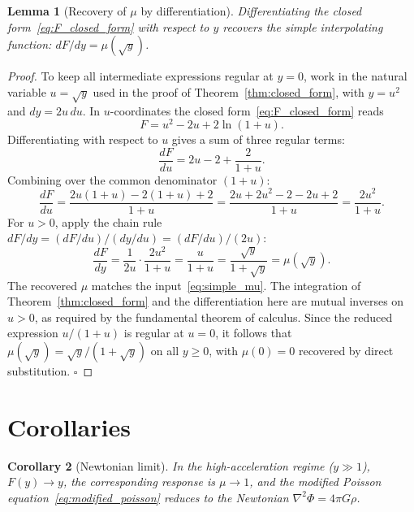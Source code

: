 \documentclass[twocolumn]{iopjournal}
\newtheorem{lemma}{Lemma}
\newtheorem{corollary}[lemma]{Corollary}
\theoremstyle{definition}
\begin{document}
\begin{lemma}[Recovery of $\mu$ by differentiation]
\label{lem:recovery}
Differentiating the closed form~\eqref{eq:F_closed_form} with
respect to $y$ recovers the simple interpolating function:
$dF/dy = \mu(\sqrt{y})$.
\end{lemma}

\begin{proof}
To keep all intermediate expressions regular at $y = 0$, work
in the natural variable $u = \sqrt{y}$ used in the proof of
Theorem~\ref{thm:closed_form}, with $y = u^2$ and $dy = 2u\, du$.
In $u$-coordinates the closed form~\eqref{eq:F_closed_form} reads
\begin{equation}
  F = u^2 - 2u + 2\ln(1 + u).
\end{equation}
Differentiating with respect to $u$ gives a sum of three regular
terms:
\begin{equation}
  \frac{dF}{du} = 2u - 2 + \frac{2}{1 + u}.
\end{equation}
Combining over the common denominator $(1+u)$:
\begin{equation}
  \frac{dF}{du}
  = \frac{2u(1+u) - 2(1+u) + 2}{1+u}
  = \frac{2u + 2u^2 - 2 - 2u + 2}{1+u}
  = \frac{2u^2}{1+u}.
\end{equation}
For $u > 0$, apply the chain rule
$dF/dy = (dF/du)/(dy/du) = (dF/du)/(2u)$:
\begin{equation}
  \frac{dF}{dy}
  = \frac{1}{2u} \cdot \frac{2u^2}{1+u}
  = \frac{u}{1+u}
  = \frac{\sqrt{y}}{1 + \sqrt{y}}
  = \mu(\sqrt{y}).
  \label{eq:recovery}
\end{equation}
The recovered $\mu$ matches the input~\eqref{eq:simple_mu}.  The
integration of Theorem~\ref{thm:closed_form} and the
differentiation here are mutual inverses on $u > 0$, as required
by the fundamental theorem of calculus.  Since the reduced
expression $u/(1+u)$ is regular at $u = 0$, it follows that
$\mu(\sqrt{y}) = \sqrt{y}/(1 + \sqrt{y})$ on all $y \geq 0$,
with $\mu(0) = 0$ recovered by direct substitution.
\hfill$\square$
\end{proof}


\section*{Corollaries}

\begin{corollary}[Newtonian limit]
\label{cor:newtonian}
In the high-acceleration regime ($y \gg 1$), $F(y) \to y$,
the corresponding response is $\mu \to 1$, and the modified
Poisson equation~\eqref{eq:modified_poisson} reduces to the
Newtonian $\nabla^2\Phi = 4\pi G\rho$.
\end{corollary}
\end{document}
